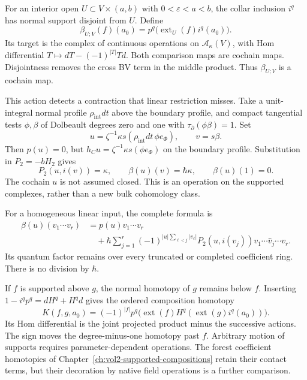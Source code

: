 For an interior open \(U\subset V\times(a,b)\) with
\(0<\varepsilon<a<b\), the collar inclusion \(i^q\) has normal support
disjoint from \(U\). Define
\begin{equation}\label{eq:vol2-native-supported-action}
 \beta_{U;V}(f)(a_0)
       =p^q\bigl(\operatorname{ext}_U(f)i^q(a_0)\bigr).
\end{equation}
Its target is the complex of continuous operations on
\(\mathcal A_\kappa(V)\), with Hom differential
\(T\mapsto dT-(-1)^{|T|}Td\). Both comparison maps are cochain maps.
Disjointness removes the cross BV term in the middle product.
Thus \(\beta_{U;V}\) is a cochain map.

This action detects a contraction that linear restriction misses.
Take a unit-integral normal profile \(\rho_{\mathrm{int}}dt\) above the
boundary profile, and compact tangential tests \(\phi,\beta\) of
Dolbeault degrees zero and one with \(\tau_\partial(\phi\beta)=1\).
Set
\[
 u=\zeta^{-1}\kappa s(\rho_{\mathrm{int}}dt\,\phi e_\Phi),
 \qquad v=s\beta.
\]
Then \(p(u)=0\), but
\(h_Cu=\zeta^{-1}\kappa s(\phi e_\Phi)\) on the boundary profile.
Substitution in \(P_2=-bH_2\) gives
\[
 P_2(u,i(v))=\kappa,
 \qquad \beta(u)(v)=\hbar\kappa,
 \qquad \beta(u)(1)=0.
\]
The cochain \(u\) is not assumed closed. This is an operation on the
supported complexes, rather than a new bulk cohomology class.

For a homogeneous linear input, the complete formula is
\[
 \begin{split}
 \beta(u)(v_1\cdots v_r)
 &=p(u)v_1\cdots v_r\\
 &\quad+\hbar\sum_{j=1}^r
 (-1)^{|u|\sum_{\ell<j}|v_\ell|}P_2(u,i(v_j))
                  v_1\cdots\widehat v_j\cdots v_r.
 \end{split}
\]
Its quantum factor remains over every truncated or completed coefficient
ring. There is no division by \(\hbar\).

If \(f\) is supported above \(g\), the normal homotopy of \(g\) remains
below \(f\). Inserting \(1-i^qp^q=dH^q+H^qd\) gives the ordered
composition homotopy
\begin{equation}\label{eq:vol2-native-action-homotopy}
 K(f,g,a_0)=(-1)^{|f|}p^q\bigl(
       \operatorname{ext}(f)H^q(\operatorname{ext}(g)i^q(a_0))\bigr).
\end{equation}
Its Hom differential is the joint projected product minus the successive
actions. The sign moves the degree-minus-one homotopy past \(f\).
Arbitrary motion of supports requires parameter-dependent operations.
The forest coefficient homotopies of
Chapter~\ref{ch:vol2-supported-compositions} retain their contact terms,
but their decoration by native field operations is a further comparison.

